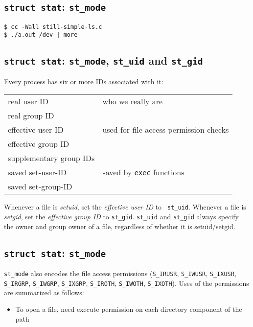 \documentclass[xga]{xdvislides}
\begin{document}
\subsection{{\tt struct stat}: {\tt st\_mode}}
\begin{verbatim}
$ cc -Wall still-simple-ls.c
$ ./a.out /dev | more
\end{verbatim}

\subsection{{\tt struct stat}: {\tt st\_mode}, {\tt st\_uid} and {\tt st\_gid}}
Every process has six or more IDs associated with it:
\\

\begin{tabular}{| l | l |}
	\hline
	real user ID & who we really are \\
	real group ID & \\
	\hline
	effective user ID & used for file access permission checks \\
	effective group ID & \\
	supplementary group IDs & \\
	\hline
	saved set-user-ID & saved by {\tt exec} functions \\
	saved set-group-ID & \\
	\hline
\end{tabular}
\vspace{.25in}

Whenever a file is {\em setuid}, set the {\em effective user ID} to {\tt
st\_uid}. Whenever a file is {\em setgid}, set the {\em effective group ID} to
{\tt st\_gid}.  {\tt st\_uid} and {\tt st\_gid} always specify the owner and
group owner of a file, regardless of whether it is setuid/setgid.

\subsection{{\tt struct stat}: {\tt st\_mode}}
{\tt st\_mode} also encodes the file access permissions ({\tt S\_IRUSR},
{\tt S\_IWUSR}, {\tt S\_IXUSR}, {\tt S\_IRGRP}, {\tt S\_IWGRP}, {\tt S\_IXGRP},
{\tt S\_IROTH}, {\tt S\_IWOTH}, {\tt S\_IXOTH}).  Uses of the permissions are
summarized as follows:

\begin{itemize}
	\item To open a file, need execute permission on each directory component of the path
\end{itemize}
\end{document}

